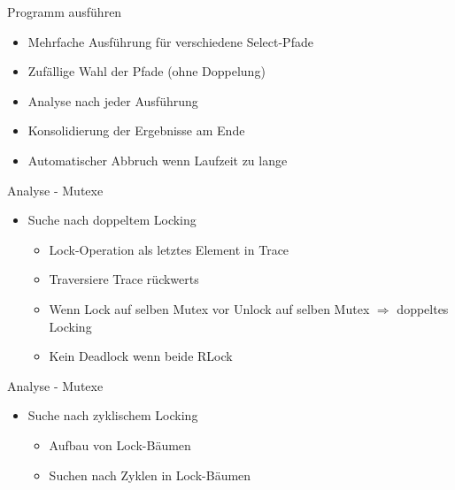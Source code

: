 \documentclass[aspectratio=169]{beamer}  %
\begin{document}

\begin{frame}{Programm ausführen}
  \begin{itemize}
    \item Mehrfache Ausführung für verschiedene Select-Pfade
    \item Zufällige Wahl der Pfade (ohne Doppelung)
    \item Analyse nach jeder Ausführung
    \item Konsolidierung der Ergebnisse am Ende
    \item Automatischer Abbruch wenn Laufzeit zu lange
  \end{itemize}
\end{frame}


\begin{frame}{Analyse - Mutexe}
  \begin{itemize}
    \item Suche nach doppeltem Locking
    \begin{itemize}
      \item Lock-Operation als letztes Element in Trace
      \item Traversiere Trace rückwerts
      \item Wenn Lock auf selben Mutex vor Unlock auf selben Mutex $\Rightarrow$ doppeltes Locking
      \item Kein Deadlock wenn beide RLock
    \end{itemize}
  \end{itemize}
\end{frame}

\begin{frame}{Analyse - Mutexe}
  \begin{itemize}
    \item Suche nach zyklischem Locking
    \begin{itemize}
      \item Aufbau von Lock-Bäumen
      \item Suchen nach Zyklen in Lock-Bäumen
    \end{itemize}
  \end{itemize}
\end{frame}
\end{document}
